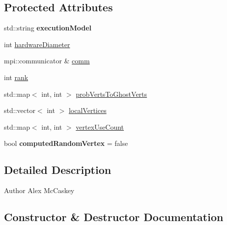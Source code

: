 \subsection*{Protected Attributes}
\begin{DoxyCompactItemize}
\item 
std\+::string {\bfseries execution\+Model}\hypertarget{a00092_a7ecbad6b40b43e024c57a4c41e8f13c6}{}\label{a00092_a7ecbad6b40b43e024c57a4c41e8f13c6}

\item 
int \hyperlink{a00092_a814ee2e5bf56df5d71065346c534aff3}{hardware\+Diameter}
\item 
mpi\+::communicator \& \hyperlink{a00092_ab667532e867c02b209e740d21eec809b}{comm}
\item 
int \hyperlink{a00092_a9d7285ee6c360563991d258977e9e1e9}{rank}
\item 
std\+::map$<$ int, int $>$ \hyperlink{a00092_af3c4dd74e7391233b124c1836295c6da}{prob\+Verts\+To\+Ghost\+Verts}
\item 
std\+::vector$<$ int $>$ \hyperlink{a00092_a7f81e1e5a286768177b71c8dffa7e9f6}{local\+Vertices}
\item 
std\+::map$<$ int, int $>$ \hyperlink{a00092_a7ab60092ad202fbd2af3ed738e2a440b}{vertex\+Use\+Count}
\item 
bool {\bfseries computed\+Random\+Vertex} = false\hypertarget{a00092_a49d40d2aad441146abdaa190bcba19ab}{}\label{a00092_a49d40d2aad441146abdaa190bcba19ab}

\end{DoxyCompactItemize}


\subsection{Detailed Description}
\begin{DoxyAuthor}{Author}
Alex Mc\+Caskey 
\end{DoxyAuthor}


\subsection{Constructor \& Destructor Documentation}
